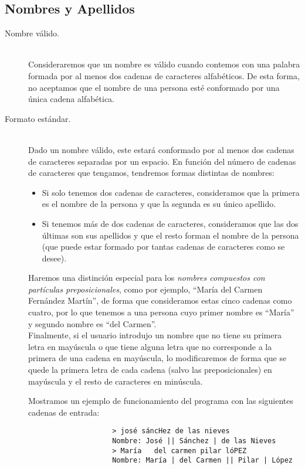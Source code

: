 \documentclass[12pt]{article}
\begin{document}
    \subsection{Nombres y Apellidos}
    \begin{description}
        \item [Nombre válido.]~\\
            Consideraremos que un nombre es válido cuando contemos con una palabra formada por al menos dos cadenas de caracteres alfabéticos. De esta forma, no aceptamos que el nombre de una persona esté conformado por una única cadena alfabética.
        \item [Formato estándar.]~\\
            Dado un nombre válido, este estará conformado por al menos dos cadenas de caracteres separadas por un espacio. En función del número de cadenas de caracteres que tengamos, tendremos formas distintas de nombres:
            \begin{itemize}
                \item Si solo tenemos dos cadenas de caracteres, consideramos que la primera es el nombre de la persona y que la segunda es su único apellido.
                \item Si tenemos más de dos cadenas de caracteres, consideramos que las dos últimas son sus apellidos y que el resto forman el nombre de la persona (que puede estar formado por tantas cadenas de caracteres como se desee).
            \end{itemize}
            Haremos una distinción especial para los \textit{nombres compuestos con partículas preposicionales}, como por ejemplo, ``María del Carmen Fernández Martín'', de forma que consideramos estas cinco cadenas como cuatro, por lo que tenemos a una persona cuyo primer nombre es ``María'' y segundo nombre es ``del Carmen''.\\

            Finalmente, si el usuario introdujo un nombre que no tiene su primera letra en mayúscula o que tiene alguna letra que no corresponde a la primera de una cadena en mayúscula, lo modificaremos de forma que se quede la primera letra de cada cadena (salvo las preposicionales) en mayúscula y el resto de caracteres en minúscula.

            \begin{ejemplo}
                Mostramos un ejemplo de funcionamiento del programa con las siguientes cadenas de entrada:
                \begin{verbatim}
                    > josé sáncHez de las nieves
                    Nombre: José || Sánchez | de las Nieves
                    > María   del carmen pilar lóPEZ
                    Nombre: María | del Carmen || Pilar | López
                \end{verbatim}
            \end{ejemplo}
    \end{description}
\end{document}
